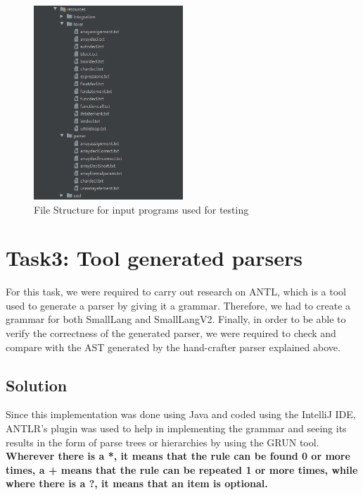 \documentclass{article}
\begin{document}
					\begin{figure}[H]
					\centering
			 			\includegraphics[width=0.5\textwidth]{filestestingpart2.png}
			  			\caption{File Structure for input programs used for testing}
			  			\label{fig:filestructure}
					\end{figure}
					
					
		\section{Task3: Tool generated parsers}
		
		For this task, we were required to carry out research on ANTL, which is a tool used to generate a parser by giving it a grammar. Therefore, we had to create a grammar for both SmallLang and SmallLangV2. Finally, in order to be able to verify the correctness of the generated parser, we were required to check and compare with the AST generated by the hand-crafter parser explained above.
		
		
			\subsection{Solution}
			
			Since this implementation was done using Java and coded using the IntelliJ IDE, ANTLR's plugin\cite{ANTLRplugin} was used to help in implementing the grammar and seeing its results in the form of parse trees or hierarchies by using the GRUN tool.  \textbf{Wherever there is a *, it means that the rule can be found 0 or more times, a + means that the rule can be repeated 1 or more times, while where there is a ?, it means that an item is optional.}\\
				
\end{document}
